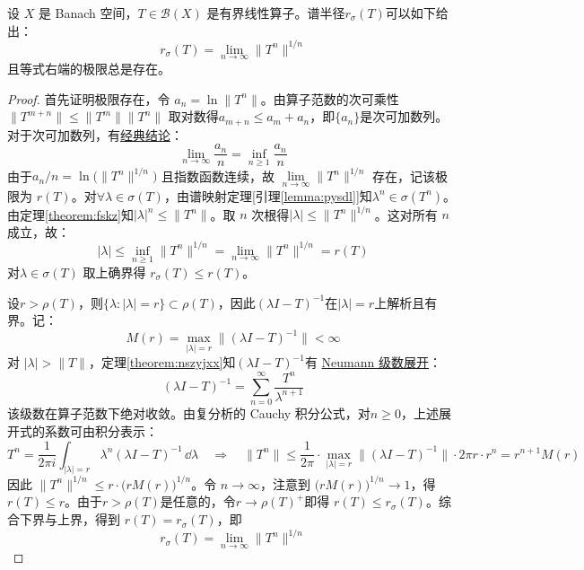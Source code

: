 \begin{theorem}[Gelfand 公式]\label{theorem:Gelfand}
设 $X$ 是 Banach 空间，$T\in\mathscr{B}(X)$ 是有界线性算子。谱半径$r_{\sigma}(T)$可以如下给出：
\[r_{\sigma}(T) = \lim_{n \to \infty} \|T^n\|^{1/n}\]
且等式右端的极限总是存在。
\end{theorem}
\begin{proof}
首先证明极限存在，令 $a_n = \ln \|T^n\|$。由算子范数的次可乘性 $\|T^{m+n}\| \le \|T^m\|\|T^n\|$ 取对数得$a_{m+n} \le a_m + a_n$，即$\{a_n\}$是次可加数列。对于次可加数列，有\href{https://math.fandom.com/zh/wiki/Fekete_%E5%BC%95%E7%90%86}{经典结论}：
\[\lim_{n \to \infty} \frac{a_n}{n} = \inf_{n \ge 1} \frac{a_n}{n}\]
由于$a_n/n=\ln\bigl(\|T^n\|^{1/n}\bigr)$ 且指数函数连续，故 $\lim\limits_{n \to \infty} \|T^n\|^{1/n}$ 存在，记该极限为 $r(T)$。对$\forall \lambda \in \sigma(T)$，由谱映射定理[引理\ref{lemma:pysdl}]知$\lambda^n \in \sigma(T^n)$。由定理\ref{theorem:fskz}知$|\lambda|^n \le \|T^n\|$。取 $n$ 次根得$|\lambda| \le \|T^n\|^{1/n}$。这对所有 $n$ 成立，故：
\[|\lambda| \le \inf_{n \ge 1} \|T^n\|^{1/n} = \lim_{n \to \infty} \|T^n\|^{1/n} = r(T)\]
对$\lambda \in \sigma(T)$ 取上确界得 $r_{\sigma}(T) \le r(T)$。

设$r > \rho(T)$，则$\{\lambda: |\lambda| = r\} \subset \rho(T)$，因此$(\lambda I - T)^{-1}$在$|\lambda| = r$上解析且有界。记：
\[M(r) = \max_{|\lambda| = r} \|(\lambda I - T)^{-1}\| < \infty\]
对 $|\lambda| > \|T\|$，定理\ref{theorem:nszyjxx}知$(\lambda I - T)^{-1}$有 \href{https://math.fandom.com/zh/wiki/%E8%B0%B1}{Neumann 级数展开}：
\[(\lambda I - T)^{-1} = \sum_{n=0}^{\infty} \frac{T^n}{\lambda^{n+1}}\]
该级数在算子范数下绝对收敛。由复分析的 Cauchy 积分公式，对$n \ge 0$，上述展开式的系数可由积分表示：
\[T^n = \frac{1}{2\pi i} \int_{|\lambda| = r} \lambda^n (\lambda I - T)^{-1} \, \dd\lambda \quad \Rightarrow \quad \|T^n\|\le \frac{1}{2\pi} \cdot \max_{|\lambda| = r} \|(\lambda I - T)^{-1}\| \cdot 2\pi r \cdot r^n = r^{n+1} M(r)\]
因此 $\|T^n\|^{1/n} \le r \cdot \bigl(r M(r)\bigr)^{1/n}$。令 $n \to \infty$，注意到 $\bigl(r M(r)\bigr)^{1/n} \to 1$，得$r(T) \le r$。由于$r > \rho(T)$是任意的，令$r \to \rho(T)^+$即得 $r(T) \le r_{\sigma}(T)$。综合下界与上界，得到 $r(T) = r_{\sigma}(T)$，即
\[r_{\sigma}(T) = \lim_{n \to \infty} \|T^n\|^{1/n}\]
\end{proof}

